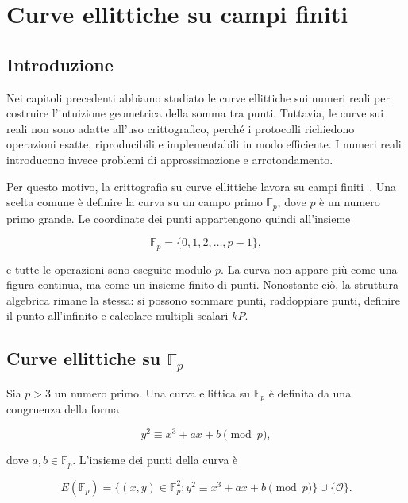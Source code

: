 \documentclass[12pt,a4paper,oneside]{report}
\begin{document}
\chapter{Curve ellittiche su campi finiti}

\section{Introduzione}

Nei capitoli precedenti abbiamo studiato le curve ellittiche sui numeri reali per costruire l'intuizione geometrica della somma tra punti. Tuttavia, le curve sui reali non sono adatte all'uso crittografico, perché i protocolli richiedono operazioni esatte, riproducibili e implementabili in modo efficiente. I numeri reali introducono invece problemi di approssimazione e arrotondamento.

Per questo motivo, la crittografia su curve ellittiche lavora su campi finiti~\cite{margara_ec,sec1}. Una scelta comune è definire la curva su un campo primo \(\mathbb{F}_p\), dove \(p\) è un numero primo grande. Le coordinate dei punti appartengono quindi all'insieme

\[
\mathbb{F}_p=\{0,1,2,\ldots,p-1\},
\]

e tutte le operazioni sono eseguite modulo \(p\). La curva non appare più come una figura continua, ma come un insieme finito di punti. Nonostante ciò, la struttura algebrica rimane la stessa: si possono sommare punti, raddoppiare punti, definire il punto all'infinito e calcolare multipli scalari \(kP\).

\section{Curve ellittiche su \texorpdfstring{\(\mathbb{F}_p\)}{Fp}}

Sia \(p>3\) un numero primo. Una curva ellittica su \(\mathbb{F}_p\) è definita da una congruenza della forma~\cite{margara_ec,sec1}

\begin{equation}
    y^2 \equiv x^3+ax+b \pmod p,
    \label{eq:ec-fp}
\end{equation}

dove \(a,b\in\mathbb{F}_p\). L'insieme dei punti della curva è~\cite{margara_ec,sec1}

\begin{equation}
    E(\mathbb{F}_p)=
    \{(x,y)\in\mathbb{F}_p^2 : y^2\equiv x^3+ax+b \pmod p\}
    \cup\{\mathcal{O}\}.
\end{equation}
\end{document}
